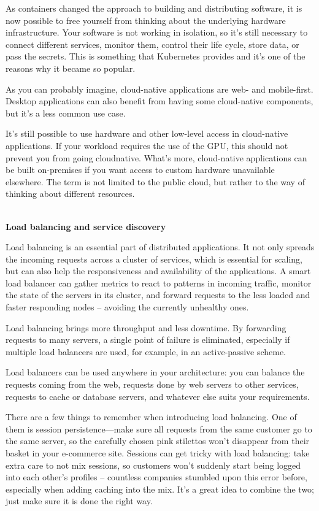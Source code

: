 As containers changed the approach to building and distributing software, it is now possible to free yourself from thinking about the underlying hardware infrastructure. Your software is not working in isolation, so it's still necessary to connect different services, monitor them, control their life cycle, store data, or pass the secrets. This is something that Kubernetes provides and it's one of the reasons why it became so popular.

As you can probably imagine, cloud-native applications are web- and mobile-first. Desktop applications can also benefit from having some cloud-native components, but it's a less common use case.

It's still possible to use hardware and other low-level access in cloud-native applications. If your workload requires the use of the GPU, this should not prevent you from going cloudnative. What's more, cloud-native applications can be built on-premises if you want access to custom hardware unavailable elsewhere. The term is not limited to the public cloud, but rather to the way of thinking about different resources.

\hspace*{\fill} \\ %
\noindent
\textbf{Load balancing and service discovery}

Load balancing is an essential part of distributed applications. It not only spreads the incoming requests across a cluster of services, which is essential for scaling, but can also help the responsiveness and availability of the applications. A smart load balancer can gather metrics to react to patterns in incoming traffic, monitor the state of the servers in its cluster, and forward requests to the less loaded and faster responding nodes – avoiding the currently unhealthy ones.

Load balancing brings more throughput and less downtime. By forwarding requests to many servers, a single point of failure is eliminated, especially if multiple load balancers are used, for example, in an active-passive scheme.

Load balancers can be used anywhere in your architecture: you can balance the requests coming from the web, requests done by web servers to other services, requests to cache or database servers, and whatever else suits your requirements.

\begin{tcolorbox}[colback=webgreen!5!white,colframe=webgreen!75!black, title=TIP]
\hspace*{0.7cm}There are a few things to remember when introducing load balancing. One of them is session persistence—make sure all requests from the same customer go to the same server, so the carefully chosen pink stilettos won't disappear from their basket in your e-commerce site. Sessions can get tricky with load balancing: take extra care to not mix sessions, so customers won't suddenly start being logged into each other's profiles – countless companies stumbled upon this error before, especially when adding caching into the mix. It's a great idea to combine the two; just make sure it is done the right way.
\end{tcolorbox}

